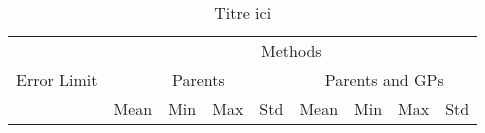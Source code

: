 \documentclass[12pt,a4paper]{report}
\begin{document}
\begin{table}
	\begin{center}
		\begin{tabular}{|c|c|c|c|c|c|c|c|c|}
			\hline
			{}          & \multicolumn{8}{c|}{Methods} \\
			\cline{2-9}
			Error Limit & \multicolumn{4}{|c|}{Parents} & \multicolumn{4}{|c|}{Parents and GPs}  \\
			\cline{2-9}
			{}          & Mean                          & Min & Max & Std & Mean & Min & Max & Std  \\
			\hline
		\end{tabular}
		\caption{Titre ici}
	\end{center}
\end{table}
\end{document}
